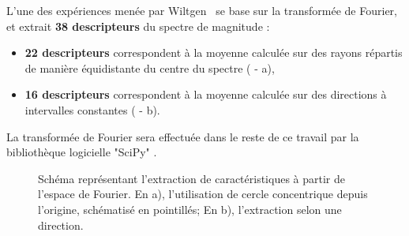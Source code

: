 L'une des expériences menée par Wiltgen~\cite{Wiltgen2008} se base sur la transformée de Fourier, et extrait \textbf{38 descripteurs} du spectre de magnitude :
\begin{itemize}
    \item \textbf{22 descripteurs} correspondent à la moyenne calculée sur des rayons répartis de manière équidistante du centre du spectre ( - a),
    \item \textbf{16 descripteurs} correspondent à la moyenne calculée sur des directions à intervalles constantes ( - b).
\end{itemize}
La transformée de Fourier sera effectuée dans le reste de ce travail par la bibliothèque logicielle "SciPy" \cite{Virtanen2020}.\par

\begin{figure}[h]
    \begin{center}
        \qquad
    \end{center}
    \caption{Schéma représentant l'extraction de caractéristiques à partir de l'espace de Fourier. En a), l'utilisation de cercle concentrique depuis l'origine, schématisé en pointillés; En b), l'extraction selon une direction.}
    \label{fig:scheme_fourier_features}
\end{figure}\par


